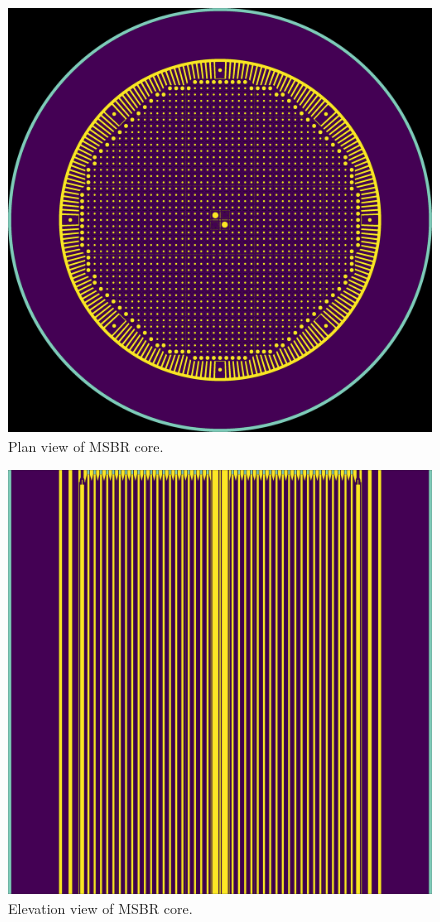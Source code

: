 \documentclass{anstrans}
\begin{document}
\begin{figure}[hbp!] %
  \centering
  \vspace{-0.3em}
  \includegraphics[width=0.95\linewidth]{figure_2_1.png}
  \caption{Plan view of \gls{MSBR} core.}
  \vspace{-0.6em}
  \label{fig:plan}
\end{figure}
\FloatBarrier

\begin{figure}[htbp!] %
  \centering
  \includegraphics[width=\linewidth]{figure_2_2.png}
  \caption{Elevation view of \gls{MSBR} core.}
  \label{fig:elevation}
\end{figure}
\end{document}
